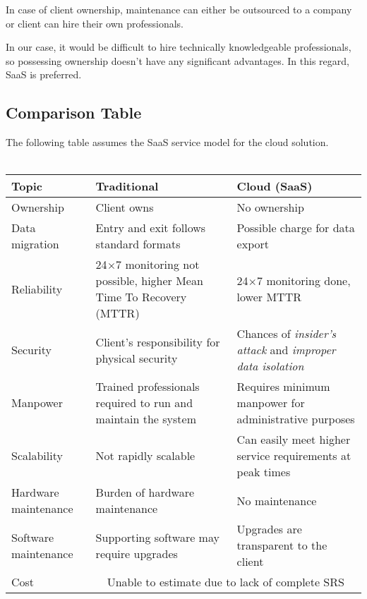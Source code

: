 \documentclass[12pt,a4paper,oneside]{article}
\begin{document}
In case of client ownership, maintenance can either be outsourced to a company
or client can hire their own professionals.

In our case, it would be difficult to hire technically knowledgeable
professionals, so possessing ownership doesn't have any significant advantages.
In this regard, SaaS is preferred.

\newpage
\subsection{Comparison Table}
The following table assumes the SaaS service model for the cloud solution. \\
\\
\renewcommand{\arraystretch}{1.5}
\begin{tabular}{|p{2.26cm}|p{5cm}|p{5.4cm}|}
	\hline
	\textbf{Topic} & \textbf{Traditional} & \textbf{Cloud (SaaS)}
	\\ \hline
	Ownership &
	Client owns &
	No ownership
	\\ \hline
	Data \newline migration &
	Entry and exit follows \newline standard formats &
	Possible charge for data \newline export
	\\ \hline
	Reliability &
	24\(\times\)7 monitoring not \newline possible, higher Mean Time To
		Recovery (MTTR) &
	24\(\times\)7 monitoring done, lower MTTR
	\\ \hline
	Security &
	Client's responsibility for physical security &
	Chances of \emph{insider's attack} and \emph{improper data isolation}
	\\ \hline
	Manpower &
	Trained professionals \newline required to run and \newline maintain the
		system &
	Requires minimum manpower for administrative purposes
	\\ \hline
	Scalability &
	Not rapidly scalable &
	Can easily meet higher service requirements at peak times
	\\ \hline
	Hardware maintenance &
	Burden of hardware \newline maintenance &
	No maintenance
	\\ \hline
	Software maintenance &
	Supporting software may require upgrades &
	Upgrades are transparent to the client
	\\ \hline
	Cost &
	\multicolumn{2}{c|}{Unable to estimate due to lack of complete SRS}
	\\ \hline
\end{tabular}
\end{document}
